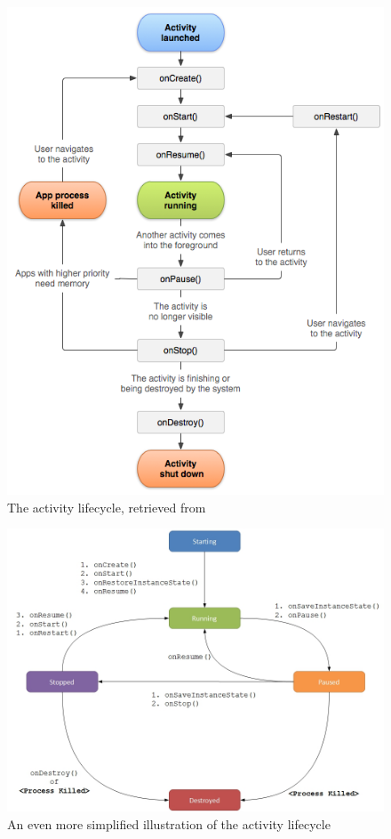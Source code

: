 \begin{figure}
	\includegraphics[width=\textwidth]{images/activity/activity_lifecycle1.png}
	\caption{The activity lifecycle, retrieved from \cite{Developers19}}
	\label{fig:lifeCycle1}
\end{figure}

\begin{figure}
	\includegraphics[width=\textwidth]{images/activity/activitylifecycle2.jpg}
		\caption{An even more simplified illustration of the activity lifecycle}
	\label{fig:lifeCycle2}
\end{figure}


